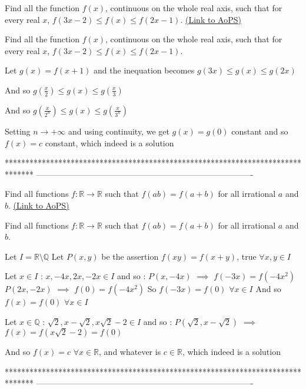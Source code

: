 \begin{problem}
	Find all the function $f(x)$, continuous on the whole real axis, such that for every real $x$,  $f(3x-2){\leq}f(x){\leq}f(2x-1)$.
	\flushright \href{https://artofproblemsolving.com/community/c6h560148}{(Link to AoPS)}
\end{problem}



\begin{solution}
	\begin{tcolorbox}Find all the function $f(x)$, continuous on the whole real axis, such that for every real $x$,  $f(3x-2){\leq}f(x){\leq}f(2x-1)$.\end{tcolorbox}
Let $g(x)=f(x+1)$ and the inequation becomes $g(3x)\le g(x)\le g(2x)$

And so $g(\frac x2)\le g(x)\le g(\frac x3)$

And so $g(\frac x{2^n})\le g(x)\le g(\frac x{3^n})$

Setting $n\to+\infty$ and using continuity, we get $g(x)=g(0)$ constant and so $\boxed{f(x)=c}$ constant, which indeed is a solution
\end{solution}
*******************************************************************************
-------------------------------------------------------------------------------

\begin{problem}
	Find all  functions $f: \mathbb{R}\to\mathbb{R}$ such that $f(ab)=f(a+b)$ for all irrational $a$ and $b$.
	\flushright \href{https://artofproblemsolving.com/community/c6h560278}{(Link to AoPS)}
\end{problem}



\begin{solution}
	\begin{tcolorbox}Find all  functions $f: \mathbb{R}\to\mathbb{R}$ such that $f(ab)=f(a+b)$ for all irrational $a$ and $b$.\end{tcolorbox}
Let $I=\mathbb R\setminus\mathbb Q$
Let $P(x,y)$ be the assertion $f(xy)=f(x+y)$, true $\forall x,y\in I$

Let $x\in I$ : $x,-4x,2x,-2x\in I$ and so :
$P(x,-4x)$ $\implies$ $f(-3x)=f(-4x^2)$
$P(2x,-2x)$ $\implies$ $f(0)=f(-4x^2)$
So $f(-3x)=f(0)$ $\forall x\in I$
And so $f(x)=f(0)$ $\forall x\in I$

Let $x\in\mathbb Q$ : $\sqrt 2,x-\sqrt 2,x\sqrt 2-2\in I$ and so :
$P(\sqrt 2,x-\sqrt 2)$ $\implies$ $f(x)=f(x\sqrt 2 - 2)=f(0)$

And so $\boxed{f(x)=c}$ $\forall x\in\mathbb R$, and whatever is $c\in\mathbb R$, which indeed is a solution
\end{solution}
*******************************************************************************
-------------------------------------------------------------------------------

